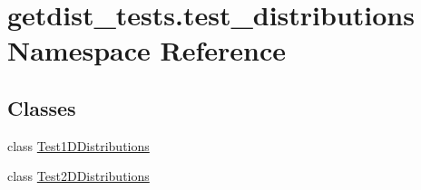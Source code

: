 \hypertarget{namespacegetdist__tests_1_1test__distributions}{}\section{getdist\+\_\+tests.\+test\+\_\+distributions Namespace Reference}
\label{namespacegetdist__tests_1_1test__distributions}
\subsection*{Classes}
\begin{DoxyCompactItemize}
\item 
class \mbox{\hyperlink{classgetdist__tests_1_1test__distributions_1_1Test1DDistributions}{Test1\+D\+Distributions}}
\item 
class \mbox{\hyperlink{classgetdist__tests_1_1test__distributions_1_1Test2DDistributions}{Test2\+D\+Distributions}}
\end{DoxyCompactItemize}
